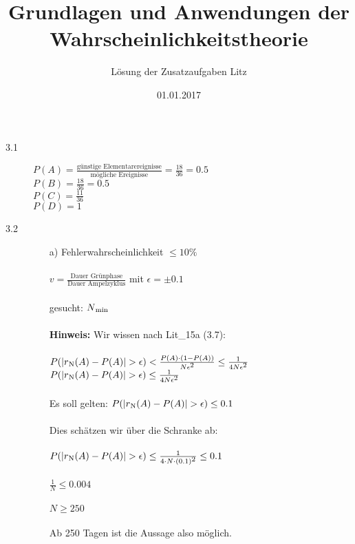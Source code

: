 \documentclass[a4paper]{article}
\begin{document}


\title{\LARGE Grundlagen und Anwendungen der Wahrscheinlichkeitstheorie} 
\author{\Large Lösung der Zusatzaufgaben Litz}
\date{01.01.2017}
\maketitle


\begin{description}

\item[3.1]
				
         $P(A)= \frac{\text{günstige Elementarereignisse}}{\text{mögliche Ereignisse}}= \frac{18}{36				}= 0.5$\\
         $P(B)= \frac{18}{36}= 0.5$\\
         $P(C)= \frac{11}{36}$\\
         $P(D)= 1$\\


\item[3.2] 
\begin{itemize}
	\item[a)] Fehlerwahrscheinlichkeit $\leq 10\%$\\
		\\
		$v=\frac{\text{Dauer Grünphase}}{\text{Dauer Ampelzyklus}}$ mit $\epsilon= \pm 0.1$\\
		\\
		gesucht: $N\textsubscript{min}$\\
		\\
		\textbf{Hinweis:} Wir wissen nach Lit\_15a (3.7):\\
		\\
		$P(\left|r\textsubscript{N}(A)-P(A)\right|>\epsilon) < \frac{P(A)\cdot(1-P(A))}{N\epsilon\textsuperscript{2}} \leq \frac{1}{4N\epsilon\textsuperscript{2}}$\\
		
		$P(\left|r\textsubscript{N}(A)-P(A)\right|>\epsilon) \leq \frac{1}{4N\epsilon\textsuperscript{2}}$\\
		\\
		Es soll gelten:
		$P(\left|r\textsubscript{N}(A)-P(A)\right|>\epsilon) \leq 0.1$ \\
		\\
		Dies schätzen wir über die Schranke ab:\\
		\\
		$P(\left|r\textsubscript{N}(A)-P(A)\right|>\epsilon) \leq \frac{1}{4\cdot N\cdot (0.1)\textsuperscript{2}} \leq 0.1$\\		\\
		$\frac{1}{N} \leq 0.004$\\
		\\
		$N \geq 250$\\
		\\
		Ab 250 Tagen ist die Aussage also möglich.\\
											

\end{itemize}
\end{description}
\end{document}
